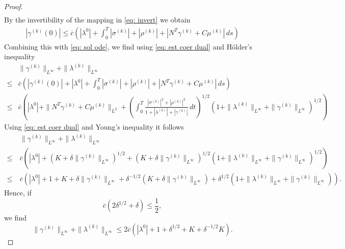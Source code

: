 \documentclass[11pt]{article}
\begin{document}
\begin{proof}
\begin{equation}
\begin{aligned}
\end{aligned}
\end{equation}
By the invertibility of the mapping in \eqref{eq: invert} we obtain 
\begin{align}\label{eq: est gamma0}
    |\gamma^{(k)}(0)| 
    \leq \overline{c} \left( |\lambda^0| + \int_0^T |\sigma^{(k)}| + |\rho^{(k)}| + |N^T\gamma^{(k)} + C \mu^{(k)}| \, ds \right)
\end{align}
Combining this with \eqref{eq: sol ode}, we find using \eqref{eq: est coer dual} and H\"older's inequality 
\begin{align*}
    &\| \gamma^{(k)} \|_{L^{\infty}} + \| \lambda^{(k)} \|_{L^{\infty}} \\
    \leq &\overline{c} \left( |\gamma^{(k)}(0)| +  |\lambda^0| + \int_0^T |\sigma^{(k)}| + |\rho^{(k)}| + |N^T\gamma^{(k)} + C \mu^{(k)}| \, ds \right) \\
    \leq &\overline{c} \left(|\lambda^0| + \| N^T \gamma^{(k)} + C \mu^{(k)}\|_{L^2} +  \left( \int_0^T \frac{|\sigma^{(k)}|^2 + |\rho^{(k)}|^2 }{1+|\lambda^{(k)}| + |\gamma^{(k)}|} \, dt \right)^{1/2} (1 + \| \lambda^{(k)} \|_{L^{\infty}} + \| \gamma^{(k)} \|_{L^{\infty}})^{1/2} \right)
    \end{align*}
Using \eqref{eq: est coer dual} and Young's inequality it follows
    \begin{align*}
        &\| \gamma^{(k)} \|_{L^{\infty}} + \| \lambda^{(k)} \|_{L^{\infty}} \\
    \leq \  &\overline{c} \left(|\lambda^0| + (K + \delta \| \gamma^{(k)}\|_{L^{\infty}})^{1/2} +  \left( K + \delta \| \gamma^{(k)}\|_{L^{\infty}} \right)^{1/2}  (1 + \| \lambda^{(k)} \|_{L^{\infty}} + \| \gamma^{(k)} \|_{L^{\infty}})^{1/2}\right) \\
\leq \  &\overline{c} \left( |\lambda^0| + 1 +  K + \delta \| \gamma^{(k)}\|_{L^{\infty}} + \delta^{-1/2}( K + \delta \| \gamma^{(k)} \|_{L^{\infty}} ) + \delta^{1/2} ( 1 + \| \lambda^{(k)} \|_{L^{\infty}} + \| \gamma^{(k)} \|_{L^{\infty}}) \right).
\end{align*}
Hence, if 
\[
\overline{c}(2\delta^{1/2}+\delta) \leq \frac12,
\]
we find 
\[
        \| \gamma^{(k)} \|_{L^{\infty}} + \| \lambda^{(k)} \|_{L^{\infty}} \leq 2 \overline{c} \left( |\lambda^0| + 1 + \delta^{1/2} + K + \delta^{-1/2} K\right).
\]


\end{proof}
\end{document}
